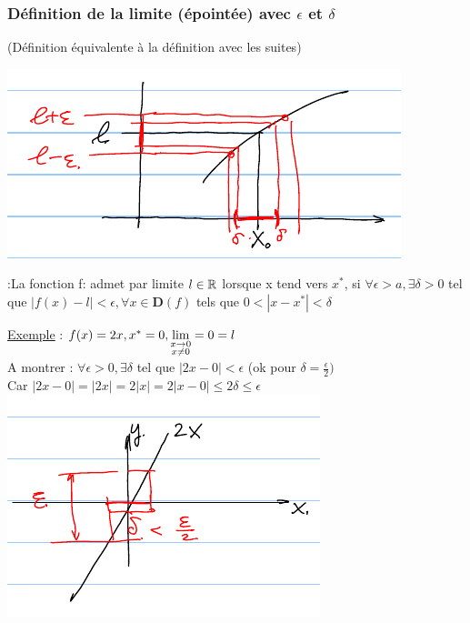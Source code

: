 \documentclass[12pt,a4paper]{article}
\newcommand{\Exemple}{\underline{Exemple} }
\begin{document}
{\subsubsection{Définition de la limite (épointée) avec $\epsilon$ et $\delta$}
(Définition équivalente à la définition avec les suites)\\
\begin{center}
\includegraphics[scale=0.5]{illustrations_Analyse/lim_epoint_epsilon}\\
\end{center}
\begin{boite}
\Definition :La fonction  f: \rtor admet par limite $l \in \mathbb{R}$ lorsque x tend vers $x^*$, si $\forall \epsilon > a, \exists \delta >0$ tel que $|f(x) - l| < \epsilon, \forall x \in \mathbf{D}(f)$ tels que $0 < |x-x^*| < \delta$
\end{boite}
\Exemple : $f(x) = 2x, x^* = 0, \lim\limits_{\substack{x \to 0 \\ x \neq 0}} = 0 = l$\\
A montrer : $\forall\epsilon > 0, \exists \delta$ tel que $|2x - 0| < \epsilon$ (ok pour $\delta = \frac{\epsilon}{2})$\\
Car $|2x-0| = |2x| = 2|x| = 2|x-0| \leq 2\delta \leq \epsilon$\\
\includegraphics[scale=0.5]{illustrations_Analyse/epsilon2x}

}
\end{document}
